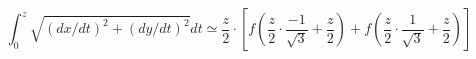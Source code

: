 \documentclass{article}
\begin{document}
\[
\int_{0}^{z}\sqrt{ \left (dx/dt \right )^2+\left (dy/dt \right )^2} dt
\simeq
\frac{z}{2} \cdot \left [ f\left( \frac{z}{2} \cdot \frac{-1}{\sqrt{3}} + \frac{z}{2} \right)
              + f\left( \frac{z}{2} \cdot \frac{1}{\sqrt{3}} + \frac{z}{2} \right)
          \right ]
\]
\end{document}
